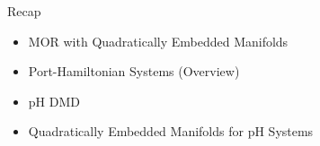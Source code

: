 \appendix

{

    \begin{frame}[standout]
        \begin{columns}
            \begin{column}{.4\textwidth}
                Recap
                {
                    \normalsize
                    \begin{itemize}
                        \item MOR with Quadratically Embedded Manifolds
                        \item Port-Hamiltonian Systems (Overview)
                        \item pH DMD
                        \item Quadratically Embedded Manifolds for pH Systems
                    \end{itemize}
                }
            \end{column}
        \end{columns}
    \end{frame}
}

